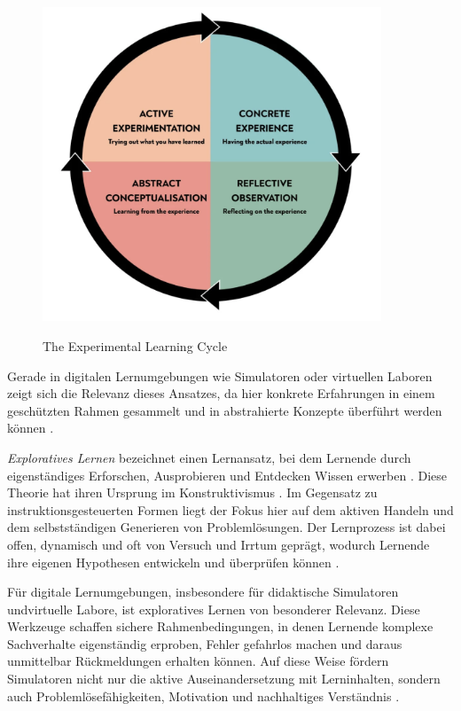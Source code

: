 \begin{figure}[htbp]
    \centering
    \includegraphics[width=0.90\textwidth]{img/ELT_cycle.png}
    \caption{The Experimental Learning Cycle}
	\parencite{mcleod_kolbs_2025}
    \label{fig:etl_cycle}
\end{figure}

Gerade in digitalen Lernumgebungen wie Simulatoren oder virtuellen Laboren zeigt sich die Relevanz dieses Ansatzes, da hier konkrete Erfahrungen in einem geschützten Rahmen gesammelt und in abstrahierte Konzepte überführt werden können \parencites[S.~3182]{reyes_enhancing_2024}[S.~7]{bazie_effect_2024}.

\textit{Exploratives Lernen} bezeichnet einen Lernansatz, bei dem Lernende durch eigenständiges Erforschen, Ausprobieren und Entdecken Wissen erwerben \parencite[S.~15]{grabinger_rich_2016}. Diese Theorie hat ihren Ursprung im Konstruktivismus \parencite[S.~271]{kornelsen_expedition_2005}. Im Gegensatz zu instruktionsgesteuerten Formen liegt der Fokus hier auf dem aktiven Handeln und dem selbstständigen Generieren von Problemlösungen. Der Lernprozess ist dabei offen, dynamisch und oft von Versuch und Irrtum geprägt, wodurch Lernende ihre eigenen Hypothesen entwickeln und überprüfen können \parencite[S.~141]{lucke_strukturierte_2005}.

Für digitale Lernumgebungen, insbesondere für didaktische Simulatoren undvirtuelle Labore, ist exploratives Lernen von besonderer Relevanz. Diese Werkzeuge schaffen sichere Rahmenbedingungen, in denen Lernende komplexe Sachverhalte eigenständig erproben, Fehler gefahrlos machen und daraus unmittelbar Rückmeldungen erhalten können. Auf diese Weise fördern Simulatoren nicht nur die aktive Auseinandersetzung mit Lerninhalten, sondern auch Problemlösefähigkeiten, Motivation und nachhaltiges Verständnis \parencite[S.~131]{engelhardt-nowitzki_einsatz_2006}.

